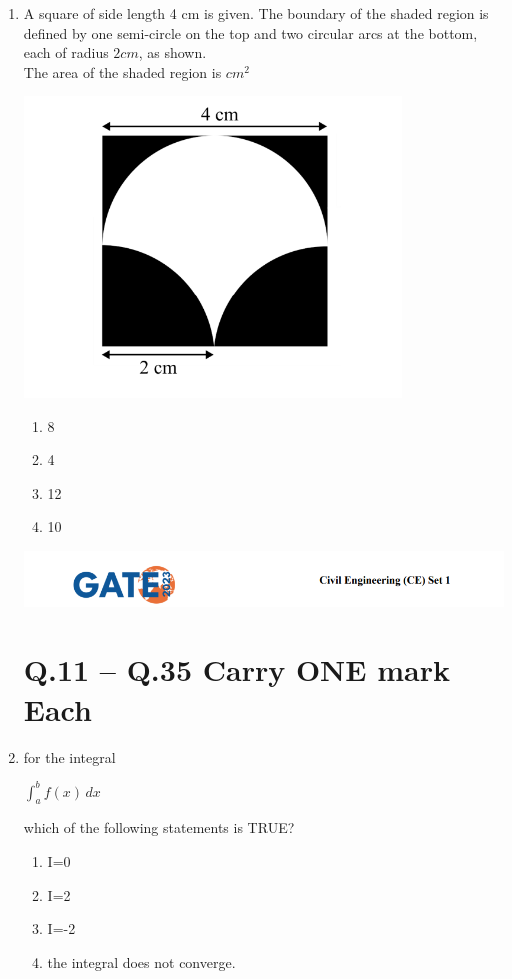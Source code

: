 \documentclass{exam}
\begin{document}
\begin{enumerate}
\item A square of side length 4 cm is given. The boundary of the shaded region is defined by one semi-circle on the top and two circular arcs at the bottom, each of radius $2 cm$, as shown.\\
The area of the shaded region is \underline{\hspace{2cm}}$cm^2$

\includegraphics[width=10cm]{pics/Screenshot 2025-08-02 131031.png}
\begin{enumerate}
    \item 8
    \item 4
    \item 12
    \item 10
\end{enumerate}

\newpage

\includegraphics[width=\textwidth]{pics/header.png}
\section*{Q.11 – Q.35 Carry ONE mark Each}

\item for the integral \\
\begin{center}
    \Large\textbf{$\int_{a}^{b} f(x) \,dx$}
\end{center}
which of the following statements is TRUE?
\begin{enumerate}
    \item I=0
    \item I=2
    \item I=-2
    \item the integral does not converge.
\end{enumerate}
\vspace{0.5cm}


\end{enumerate}
\end{document}
